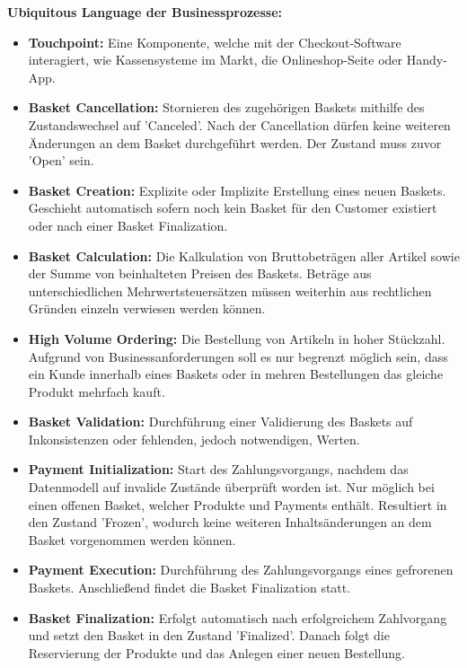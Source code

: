 \vspace{2em}

{\large \textbf{Ubiquitous Language der Businessprozesse:}}
\begin{itemize}[topsep=-3px]
	\item \textbf{Touchpoint: } { Eine Komponente, welche mit der Checkout-Software interagiert, wie Kassensysteme im Markt, die Onlineshop-Seite oder Handy-App.}
	\item \textbf{Basket Cancellation: } {Stornieren des zugehörigen Baskets mithilfe des Zustandswechsel auf 'Canceled'. Nach der Cancellation dürfen keine weiteren Änderungen an dem Basket durchgeführt werden. Der Zustand muss zuvor 'Open' sein. }
	\item \textbf{Basket Creation: } {Explizite oder Implizite Erstellung eines neuen Baskets. Geschieht automatisch sofern noch kein Basket für den Customer existiert oder nach einer Basket Finalization.}
	\item \textbf{Basket Calculation: } {Die Kalkulation von Bruttobeträgen aller Artikel sowie der Summe von beinhalteten Preisen des Baskets. Beträge aus unterschiedlichen Mehrwertsteuersätzen müssen weiterhin aus rechtlichen Gründen einzeln verwiesen werden können.}
	\item \textbf{High Volume Ordering: } {Die Bestellung von Artikeln in hoher Stückzahl. Aufgrund von Businessanforderungen soll es nur begrenzt möglich sein, dass ein Kunde innerhalb eines Baskets oder in mehren Bestellungen das gleiche Produkt mehrfach kauft.}
	\item \textbf{Basket Validation: } {Durchführung einer Validierung des Baskets auf Inkonsistenzen oder fehlenden, jedoch notwendigen, Werten.}
	\item \textbf{Payment Initialization: } {Start des Zahlungsvorgangs, nachdem das Datenmodell auf invalide Zustände überprüft worden ist. Nur möglich bei einen offenen Basket, welcher Produkte und Payments enthält. Resultiert in den Zustand 'Frozen', wodurch keine weiteren Inhaltsänderungen an dem Basket vorgenommen werden können.}
	\item \textbf{Payment Execution: } {Durchführung des Zahlungsvorgangs eines gefrorenen Baskets. Anschließend findet die Basket Finalization statt.}
	\item \textbf{Basket Finalization: } {Erfolgt automatisch nach erfolgreichem Zahlvorgang und setzt den Basket in den Zustand 'Finalized'. Danach folgt die Reservierung der Produkte und das Anlegen einer neuen Bestellung.}
\end{itemize}
\vspace{2em}

